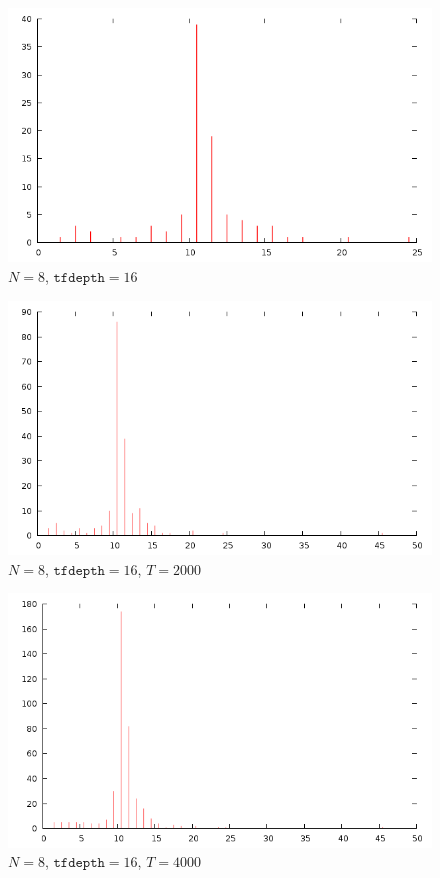 \documentclass[12pt]{article}
\begin{document}
\begin{figure}[H]
\centering
\caption{$N=8$, $\texttt{tfdepth}=16$}
\includegraphics[scale=0.6]{times8-16.png}
\end{figure} 

\begin{figure}[H]
\centering
\caption{$N=8$, $\texttt{tfdepth}=16$, $T=2000$}
\includegraphics[scale=0.6]{times8-16-2000.png}
\end{figure} 

\begin{figure}[H]
\centering
\caption{$N=8$, $\texttt{tfdepth}=16$, $T=4000$}
\includegraphics[scale=0.6]{times8-16-4000.png}
\end{figure} 
\end{document}
